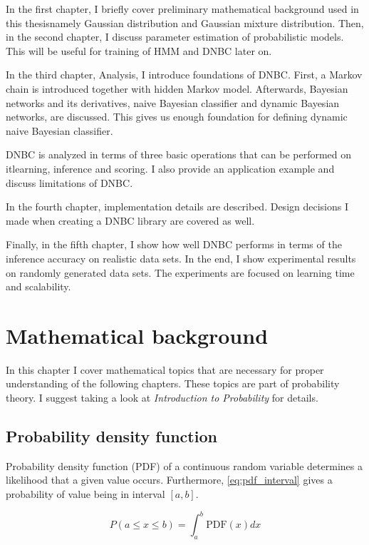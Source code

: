 \documentclass[thesis=B,english]{FITthesis}[2012/06/26]
\begin{document}
\begin{introduction}
In the first chapter, I briefly cover preliminary mathematical background used in this thesis\textemdash namely Gaussian distribution and Gaussian mixture distribution. Then, in the second chapter, I discuss parameter estimation of probabilistic models. This will be useful for training of HMM and DNBC later on.

In the third chapter, Analysis, I introduce foundations of DNBC. First, a Markov chain is introduced together with hidden Markov model. Afterwards, Bayesian networks and its derivatives, naive Bayesian classifier and dynamic Bayesian networks, are discussed. This gives us enough foundation for defining dynamic naive Bayesian classifier.

DNBC is analyzed in terms of three basic operations that can be performed on it\textemdash learning, inference and scoring. I also provide an application example and discuss limitations of DNBC.

In the fourth chapter, implementation details are described. Design decisions I made when creating a DNBC library are covered as well.

Finally, in the fifth chapter, I show how well DNBC performs in terms of the inference accuracy on realistic data sets. In the end, I show experimental results on randomly generated data sets. The experiments are focused on learning time and scalability.
\end{introduction}

\chapter{Mathematical background}

In this chapter I cover mathematical topics that are necessary for proper understanding of the following chapters. These topics are part of probability theory. I suggest taking a look at \textit{Introduction to Probability} \cite{clt-proof} for details.

\section{Probability density function}

Probability density function (PDF) of a continuous random variable determines a likelihood that a given value occurs. Furthermore, \ref{eq:pdf_interval} gives a probability of value being in interval $[a,b]$.

\begin{equation} \label{eq:pdf_interval}
P(a \leq x \leq b) = \int_a^b \text{PDF}(x) dx
\end{equation}
\end{document}
